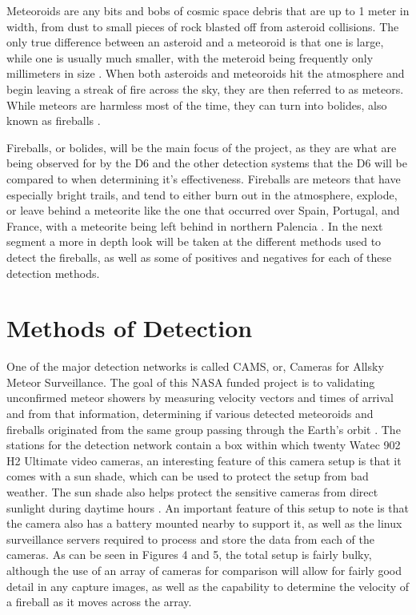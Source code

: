 Meteoroids are any bits and bobs of cosmic space debris that are up to 1 meter in width, from dust to small pieces of rock blasted off from asteroid collisions. 
The only true difference between an asteroid and a meteoroid is that one is large, while one is usually much smaller, with the meteroid being frequently only millimeters in size \cite{atkinson_2018}. 
When both asteroids and meteoroids hit the atmosphere and begin leaving a streak of fire across the sky, they are then referred to as meteors. 
While meteors are harmless most of the time, they can turn into bolides, also known as fireballs \cite{atkinson_2018}. 

Fireballs, or bolides, will be the main focus of the project, as they are what are being observed for by the D6 and the other detection systems that the D6 will be compared to when determining it's effectiveness. 
Fireballs are meteors that have especially bright trails, and tend to either burn out in the atmosphere, explode, or leave behind a meteorite like the one that occurred over Spain, Portugal, and France, with a meteorite being left behind in northern Palencia \cite{Villabeto}. 
In the next segment a more in depth look will be taken at the different methods used to detect the fireballs, as well as some of positives and negatives for each of these detection methods.

\section{Methods of Detection}

One of the major detection networks is called CAMS, or, Cameras for Allsky Meteor Surveillance. 
The goal of this NASA funded project is to validating unconfirmed meteor showers by measuring velocity vectors and times of arrival and from that information, determining if various detected meteoroids and fireballs originated from the same group passing through the Earth's orbit \cite{jenniskens}. 
The stations for the detection network contain a box within which twenty Watec 902 H2 Ultimate video cameras, an interesting feature of this camera setup is that it comes with a sun shade, which can be used to protect the setup from bad weather. 
The sun shade also helps protect the sensitive cameras from direct sunlight during daytime hours \cite{jenniskens}. 
An important feature of this setup to note is that the camera also has a battery mounted nearby to support it, as well as the linux surveillance servers required to process and store the data from each of the cameras.
As can be seen in Figures 4 and 5, the total setup is fairly bulky, although the use of an array of cameras for comparison will allow for fairly good detail in any capture images, as well as the capability to determine the velocity of a fireball as it moves across the array.


